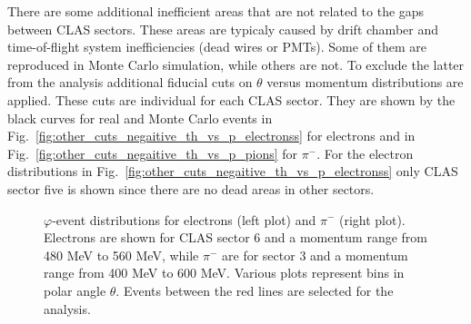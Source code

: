 There are some additional inefficient areas that are not related to the gaps between CLAS sectors. These areas are typicaly caused by drift chamber and time-of-flight system inefficiencies (dead wires or PMTs). Some of them are reproduced in Monte Carlo simulation, while others are not. To exclude the latter from the analysis additional fiducial cuts on $\theta$ versus momentum distributions are applied. These cuts are individual for each CLAS sector. They are shown by the black curves for real and Monte Carlo events in Fig.~\ref{fig:other_cuts_negaitive_th_vs_p_electronss} for electrons and in Fig.~\ref{fig:other_cuts_negaitive_th_vs_p_pions} for $\pi^{-}$. For the electron distributions in Fig.~\ref{fig:other_cuts_negaitive_th_vs_p_electronss} only CLAS sector five is shown since there are no dead areas in other sectors.


\begin{figure}[htp]
\begin{center}
\caption{\small $\varphi$-event distributions for electrons (left plot) and $\pi^{-}$ (right plot). Electrons are shown for CLAS sector 6 and a momentum range from 480 MeV to 560 MeV, while $\pi^{-}$ are for sector 3 and a momentum range from 400 MeV to 600 MeV. Various plots represent bins in polar angle $\theta$. Events between the red lines are selected for the analysis. \label{fig:fiduch_negative_1d}}
\end{center}
\end{figure}


